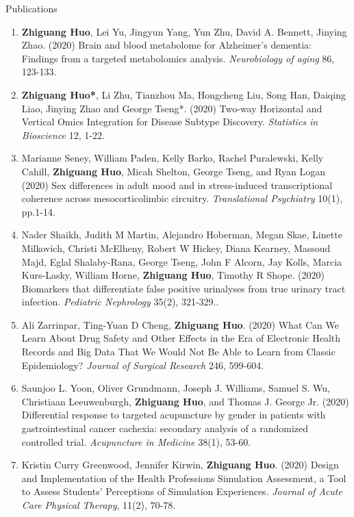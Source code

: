 \documentclass{resume} %
\begin{document}
\begin{rSection}{Publications}
\begin{enumerate}[noitemsep,topsep=0pt, resume]
\item  {\bf Zhiguang Huo}, Lei Yu, Jingyun Yang, Yun Zhu,  David A. Bennett, Jinying Zhao. (2020)
Brain and blood metabolome for Alzheimer's dementia: Findings from a targeted metabolomics analysis.
\emph{Neurobiology of aging}  86, 123-133.

\item {\bf  Zhiguang Huo*}, Li Zhu, Tianzhou Ma, Hongcheng Liu, Song Han, Daiqing Liao, Jinying Zhao and George Tseng*.  (2020)
Two-way Horizontal and Vertical Omics Integration for Disease Subtype Discovery. \emph{Statistics in Bioscience} 12, 1-22.

\item 
Marianne Seney, William Paden, Kelly Barko, Rachel Puralewski, Kelly Cahill, {\bf Zhiguang Huo}, Micah Shelton, George Tseng, and Ryan Logan
(2020)
Sex differences in adult mood and in stress-induced transcriptional coherence across mesocorticolimbic circuitry.
\emph{Translational Psychiatry}  10(1), pp.1-14.

\item
Nader Shaikh, Judith M Martin, Alejandro Hoberman, Megan Skae, Linette Milkovich, Christi McElheny, Robert W Hickey, Diana Kearney, Massoud Majd, Eglal Shalaby-Rana, George Tseng, John F Alcorn, Jay Kolls, Marcia Kurs-Lasky, William Horne, {\bf Zhiguang Huo}, Timothy R Shope.  (2020)
Biomarkers that differentiate false positive urinalyses from true urinary tract infection. 
\emph{Pediatric Nephrology}  35(2), 321-329..



\item
Ali Zarrinpar,  Ting-Yuan D Cheng, {\bf Zhiguang Huo}. (2020)
What Can We Learn About Drug Safety and Other Effects in the Era of Electronic Health Records and Big Data That We Would Not Be Able to Learn from Classic Epidemiology?
\emph{Journal of Surgical Research} 246, 599-604.

\item 
Saunjoo L. Yoon, Oliver Grundmann, Joseph J. Williams, Samuel S. Wu, Christiaan Leeuwenburgh, {\bf Zhiguang Huo}, and Thomas J. George Jr. (2020)
Differential response to targeted acupuncture by gender in patients with gastrointestinal cancer cachexia: secondary analysis of a randomized controlled trial.
\emph{Acupuncture in Medicine}  38(1), 53-60.

\item
Kristin Curry Greenwood,  Jennifer Kirwin, {\bf Zhiguang Huo}. (2020)
Design and Implementation of the Health Professions Simulation Assessment, a Tool to Assess Students' Perceptions of Simulation Experiences. \emph{Journal of Acute Care Physical Therapy}, 11(2), 70-78.



\end{enumerate}
\end{rSection}
\end{document}
